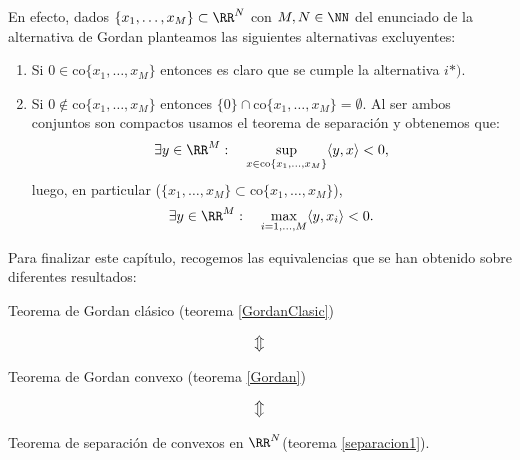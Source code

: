 En efecto, dados $ \{x_1,\dots, x_M \} \subset \RR^N $ con $ M, N \in \NN  $ del enunciado de la alternativa de Gordan planteamos las siguientes alternativas excluyentes:
\begin{enumerate}
\item Si $ 0 \in \mathrm{co}\{x_1,\dots, x_M \} $ entonces es claro que se cumple la alternativa $ i*) $.
\item Si $ 0 \notin \mathrm{co}\{x_1,\dots, x_M \} $ entonces $ \{0\} \cap \mathrm{co}\{x_1,\dots, x_M \} = \emptyset $. Al ser ambos conjuntos son compactos usamos el teorema de separación y obtenemos que:
\[
\exists y \in \RR^M: \quad \sup_{x \in \mathrm{co}\{x_1,\dots, x_M \}} \langle y, x \rangle < 0,
\]
luego, en particular ($ \{x_1,\dots, x_M \} \subset \mathrm{co}\{x_1,\dots, x_M \}   $),
\[
\exists y \in \RR^M: \quad \max_{i = 1,\dots, M} \langle y, x_i \rangle < 0.
\]
\end{enumerate}
\bigskip

Para finalizar este capítulo, recogemos las equivalencias que se han obtenido sobre diferentes resultados:
\begin{center}
	Teorema de Gordan clásico (teorema \ref{GordanClasic})
\end{center}
\[
\big\Updownarrow
\]
\begin{center}
	Teorema de Gordan convexo (teorema \ref{Gordan})
\end{center}
\[
\big\Updownarrow
\]
\begin{center}
	Teorema de separación de convexos en $ \RR^N $(teorema \ref{separacion1}).
\end{center}
